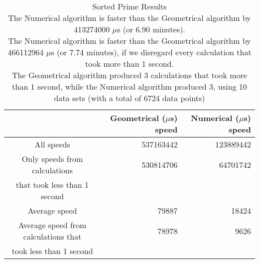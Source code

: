 \begin{table}[bth!]\footnotesize
 \begin{tabular}[3]{c|r|r}
 & Geometrical ($\mu$s) speed & Numerical ($\mu$s) speed\\
\hline
All speeds & 537163442 & 123889442 \\ 
\hline 
Only speeds from calculations & 530814706 & 64701742 \\ 
that took less than 1 second & & \\ 
\hline
Average speed & 79887 & 18424 \\
\hline
Average speed from calculations that & 78978 & 9626 \\ 
took less than 1 second & & \\ 
\end{tabular}\\ \\
\caption{Sorted Prime Results\\
The Numerical algorithm is faster than the Geometrical algorithm by 413274000 $\mu$s (or 6.90 minutes).\\
The Numerical algorithm is faster than the Geometrical algorithm by 466112964 $\mu$s (or 7.74 minutes), if we disregard every calculation that took more than 1 second.\\
The Geometrical algorithm produced 3 calculations that took more than 1 second, while the Numerical algorithm produced 3, using 10 data sets (with a total of 6724 data points)\\
}\label{prime-normal_speedtable}\end{table}